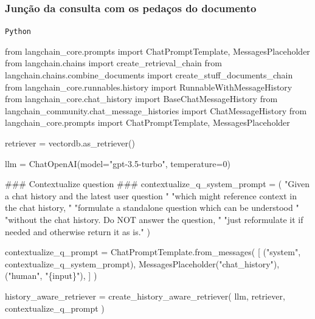 \documentclass[
  letterpaper,
  DIV=11,
  numbers=noendperiod]{scrartcl}
\newenvironment{Shaded}{\begin{snugshade}}{\end{snugshade}}
\newcommand{\AlertTok}[1]{\textcolor[rgb]{0.68,0.00,0.00}{#1}}
\newcommand{\CommentTok}[1]{\textcolor[rgb]{0.37,0.37,0.37}{#1}}
\newcommand{\DecValTok}[1]{\textcolor[rgb]{0.68,0.00,0.00}{#1}}
\newcommand{\ImportTok}[1]{\textcolor[rgb]{0.00,0.46,0.62}{#1}}
\newcommand{\NormalTok}[1]{\textcolor[rgb]{0.00,0.23,0.31}{#1}}
\newcommand{\OperatorTok}[1]{\textcolor[rgb]{0.37,0.37,0.37}{#1}}
\newcommand{\SpecialCharTok}[1]{\textcolor[rgb]{0.37,0.37,0.37}{#1}}
\newcommand{\StringTok}[1]{\textcolor[rgb]{0.13,0.47,0.30}{#1}}
\begin{document}
\hypertarget{junuxe7uxe3o-da-consulta-com-os-pedauxe7os-do-documento}{%
\subsubsection{Junção da consulta com os pedaços do
documento}\label{junuxe7uxe3o-da-consulta-com-os-pedauxe7os-do-documento}}

\begin{codelisting}

\caption{\texttt{Python}}

\begin{Shaded}
\begin{Highlighting}[]
\ImportTok{from}\NormalTok{ langchain\_core.prompts }\ImportTok{import}\NormalTok{ ChatPromptTemplate, MessagesPlaceholder}
\ImportTok{from}\NormalTok{ langchain.chains }\ImportTok{import}\NormalTok{ create\_retrieval\_chain}
\ImportTok{from}\NormalTok{ langchain.chains.combine\_documents }\ImportTok{import}\NormalTok{ create\_stuff\_documents\_chain}
\ImportTok{from}\NormalTok{ langchain\_core.runnables.history }\ImportTok{import}\NormalTok{ RunnableWithMessageHistory}
\ImportTok{from}\NormalTok{ langchain\_core.chat\_history }\ImportTok{import}\NormalTok{ BaseChatMessageHistory}
\ImportTok{from}\NormalTok{ langchain\_community.chat\_message\_histories }\ImportTok{import}\NormalTok{ ChatMessageHistory}
\ImportTok{from}\NormalTok{ langchain\_core.prompts }\ImportTok{import}\NormalTok{ ChatPromptTemplate, MessagesPlaceholder}

\NormalTok{retriever }\OperatorTok{=}\NormalTok{ vectordb.as\_retriever()}

\NormalTok{llm }\OperatorTok{=}\NormalTok{ ChatOpenAI(model}\OperatorTok{=}\StringTok{"gpt{-}3.5{-}turbo"}\NormalTok{, temperature}\OperatorTok{=}\DecValTok{0}\NormalTok{)}

\CommentTok{\#\#\# Contextualize question }\AlertTok{\#\#\#}
\NormalTok{contextualize\_q\_system\_prompt }\OperatorTok{=}\NormalTok{ (}
    \StringTok{"Given a chat history and the latest user question "}
    \StringTok{"which might reference context in the chat history, "}
    \StringTok{"formulate a standalone question which can be understood "}
    \StringTok{"without the chat history. Do NOT answer the question, "}
    \StringTok{"just reformulate it if needed and otherwise return it as is."}
\NormalTok{)}

\NormalTok{contextualize\_q\_prompt }\OperatorTok{=}\NormalTok{ ChatPromptTemplate.from\_messages(}
\NormalTok{    [}
\NormalTok{        (}\StringTok{"system"}\NormalTok{, contextualize\_q\_system\_prompt),}
\NormalTok{        MessagesPlaceholder(}\StringTok{"chat\_history"}\NormalTok{),}
\NormalTok{        (}\StringTok{"human"}\NormalTok{, }\StringTok{"}\SpecialCharTok{\{input\}}\StringTok{"}\NormalTok{),}
\NormalTok{    ]}
\NormalTok{)}

\NormalTok{history\_aware\_retriever }\OperatorTok{=}\NormalTok{ create\_history\_aware\_retriever(}
\NormalTok{    llm, retriever, contextualize\_q\_prompt}
\NormalTok{)}
\end{Highlighting}
\end{Shaded}

\end{codelisting}
\end{document}
